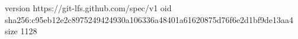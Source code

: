 version https://git-lfs.github.com/spec/v1
oid sha256:c95eb12e2c8975249424930a106336a48401a61620875d76f6e2d1bf9de13aa4
size 1128
